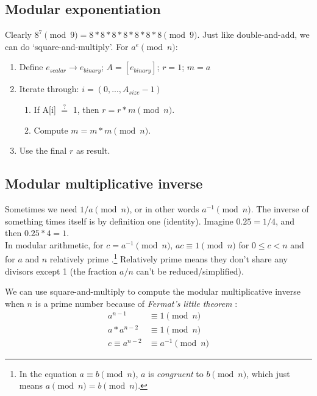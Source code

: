 \subsection{Modular exponentiation}
\label{subsec:modular-exponentiation}

Clearly $8^7 \pmod 9 = 8*8*8*8*8*8*8 \pmod 9$. Just like double-and-add, we can do `square-and-multiply'. For $a^e \pmod{n}$:
\begin{enumerate}
	\item Define $e_{scalar} \rightarrow e_{binary}$; $A = [e_{binary}]$; $r = 1$; $m = a$
	\item Iterate through: $i = (0,...,A_{size} - 1)$
	\begin{enumerate}
		\item If A[i] $\stackrel{?}{=}$ 1, then $r = r * m \pmod n$.
		\item Compute $m = m * m \pmod n$.
	\end{enumerate}
	\item Use the final $r$ as result.
\end{enumerate}


\subsection{Modular multiplicative inverse}
\label{subsec:modular-multiplicative-inverse}

Sometimes we need $1/a \pmod n$, or in other words $a^{-1} \pmod n$. The inverse of something times itself is by definition one (identity). Imagine $0.25 = 1/4$, and then $0.25*4 = 1$.\\

In modular arithmetic, for $c = a^{-1} \pmod{n}$, $a c \equiv 1 \pmod{n}$ for $0 \leq c < n$ and for $a$ and $n$ relatively prime \cite{shoup-modular-multiplicative-inverse}.\footnote{In the equation $a \equiv b \pmod{n}$, $a$ is {\em congruent} to $b \pmod{n}$, which just means \(a \pmod{n} = b \pmod{n}\).} Relatively prime means they don't share any divisors except 1 (the fraction $a/n$ can't be reduced/simplified).

We can use square-and-multiply to compute the modular multiplicative inverse when $n$ is a prime number because of {\em Fermat's little theorem} \cite{fermats-little-theorem}:\vspace{.175cm}
\begin{align*} 
    a^{n-1} &\equiv 1 \pmod{n} \\
    a*a^{n-2} &\equiv 1 \pmod{n} \\
    c \equiv a^{n-2} &\equiv a^{-1} \pmod{n}
\end{align*}

